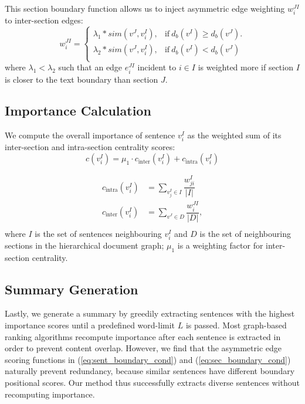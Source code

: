 \documentclass[11pt,a4paper]{article}
\begin{document}
This section boundary function allows us to inject asymmetric edge weighting $w^{JI}_{i}$ to inter-section edges:
    \begin{equation}\label{eq:sec_boundary_cond}
        w^{JI}_{i}= 
    \begin{cases}
    \lambda_1*sim(v^J, v^I_i), & \textrm{if} \: d_b(v^I) \geq d_b(v^J).\\
    \lambda_2*sim(v^J, v^I_i), & \textrm{if} \: d_b(v^I) < d_b(v^J)\\
    \end{cases}
    \end{equation}
where $\lambda_1 <\lambda_2$ such that an edge $e^{JI}_{i}$ incident to $i \in I$ is weighted more if section $I$ is closer to the text boundary than section $J$. 
    
\subsection{Importance Calculation}\label{sub-sec:method_centrality}
We compute the overall importance of sentence $v^I_i$ as the weighted sum of its inter-section and intra-section centrality scores:
  \begin{equation}\label{eq:importance}
        c(v^I_i) = \mu_1 \cdot c_{\text{inter}}(v^I_i) + c_{\text{intra}}(v^I_i)
    \end{equation}
    
  \begin{equation}\label{eq:centrality}
    \begin{split}
    c_{\text{intra}}(v^I_i) &= \sum_{v^I_j \in I} \dfrac{ w^I_{ji}}{|I|} \\  
    c_{\text{inter}}(v^I_i) &= \sum_{v^J \in D} \dfrac{ w^{JI}_{i}}{|D|}, \\  
    \end{split}
    \end{equation}
where $I$ is the set of sentences neighbouring $v^I_i$ and $D$ is the set of neighbouring sections in the hierarchical document graph; $\mu_1$ is a weighting factor for  inter-section centrality.

\subsection{Summary Generation}\label{sub-sec:method_generation}
Lastly, we generate a summary by greedily extracting sentences with the highest importance scores until a predefined word-limit $L$ is passed. Most graph-based ranking algorithms recompute importance after each sentence is extracted in order to prevent content overlap. However, we find that the asymmetric edge scoring functions in (\ref{eq:sent_boundary_cond}) and (\ref{eq:sec_boundary_cond}) naturally prevent redundancy, because similar sentences have different boundary positional scores. Our method thus successfully extracts diverse sentences without recomputing importance.
\end{document}
